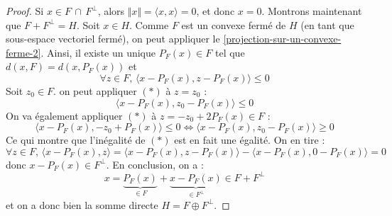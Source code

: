   \begin{proof}
    Si $x \in F \, \cap \, F^\perp$, alors $\Vert x \Vert = \langle x, x \rangle = 0$, et donc $x = 0$. Montrons maintenant que $F + F^\perp = H$. Soit $x \in H$. Comme $F$ est un convexe fermé de $H$ (en tant que sous-espace vectoriel fermé), on peut appliquer le \cref{projection-sur-un-convexe-ferme-2}. Ainsi, il existe un unique $P_F(x) \in F$ tel que $d(x, F) = d(x, P_F(x))$ et
    \[ \forall z \in F, \, \langle x - P_F(x), z - P_F(x) \rangle \leq 0 \tag{$*$} \]
    Soit $z_0 \in F$. on peut appliquer $(*)$ à $z = z_0$ :
    \[ \langle x - P_F(x), z_0 - P_F(x) \rangle \leq 0 \]
    On va également appliquer $(*)$ à $z = -z_0 + 2P_F(x) \in F$ :
    \[ \langle x - P_F(x), -z_0 + P_F(x) \rangle \leq 0 \iff \langle x - P_F(x), z_0 - P_F(x) \rangle \geq 0 \]
    Ce qui montre que l'inégalité de $(*)$ est en fait une égalité. On en tire :
    \[ \forall z \in F, \, \langle x - P_F(x), z \rangle = \langle x - P_F(x), z - P_F(x) \rangle - \langle x - P_F(x), 0 - P_F(x) \rangle = 0 \]
    donc $x - P_F(x) \in F^\perp$. En conclusion, on a :
    \[ x = \underbrace{P_F(x)}_{\in F} + \underbrace{x - P_F(x)}_{\in F^\perp} \in F + F^\perp \]
    et on a donc bien la somme directe $H = F \oplus F^\perp$.
  \end{proof}

